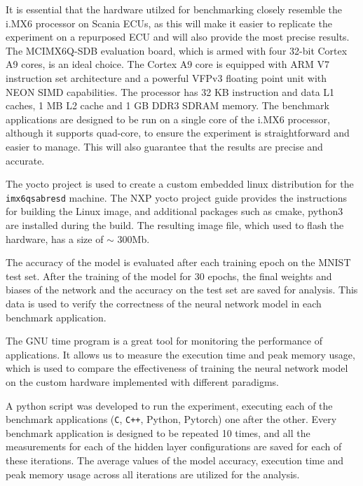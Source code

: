 It is essential that the hardware utilzed for benchmarking closely resemble the i.MX6 processor on Scania ECUs, as this will make it easier to replicate the experiment on a repurposed ECU and will also provide the most precise results. The MCIMX6Q-SDB evaluation board, which is armed with four 32-bit Cortex A9 cores, is an ideal choice. The Cortex A9 core is equipped with ARM V7 instruction set architecture and a powerful VFPv3 floating point unit with NEON SIMD capabilities. The processor has 32 KB instruction and data L1 caches, 1 MB L2 cache and 1 GB DDR3 SDRAM memory. The benchmark applications are designed to be run on a single core of the i.MX6 processor, although it supports quad-core, to ensure the experiment is straightforward and easier to manage. This will also guarantee that the results are precise and accurate.

The yocto project is used to create a custom embedded linux distribution for the \texttt{imx6qsabresd} machine. The NXP yocto project guide \cite{nxp-yocto} provides the instructions for building the Linux image, and additional packages such as cmake, python3 are installed during the build. The resulting image file, which used to flash the hardware, has a size of $\sim$ 300Mb.

The accuracy of the model is evaluated after each training epoch on the MNIST test set. After the training of the model for 30 epochs, the final weights and biases of the network and the accuracy on the test set are saved for analysis. This data is used to verify the correctness of the neural network model in each benchmark application.

The GNU time program is a great tool for monitoring the performance of applications. It allows us to measure the execution time and peak memory usage, which is used to compare the effectiveness of training the neural network model on the custom hardware implemented with different paradigms.

A python script was developed to run the experiment, executing each of the benchmark applications (\texttt{C}, \texttt{C++}, Python, Pytorch) one after the other. Every benchmark application is designed to be repeated 10 times, and all the measurements for each of the hidden layer configurations are saved for each of these iterations. The average values of the model accuracy, execution time and peak memory usage across all iterations are utilized for the analysis.


